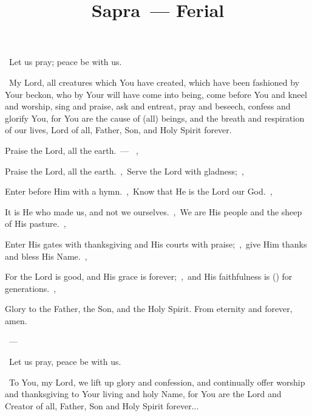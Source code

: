 \documentclass[12pt,twoside,a5paper]{article}
\begin{document}
\title{Sapra~--- Ferial}
\author{}
\date{}
\maketitle


\dd~Let us pray; peace be with us.

\cc~My Lord, all creatures which You have created, which have been fashioned by Your beckon, who by Your will have come into being, come before You and kneel and worship, sing and praise, ask and entreat, pray and beseech, confess and glorify You, for You are the cause of (all) beings, and the breath and respiration of our lives, Lord of all, Father, Son, and Holy Spirit forever.



\begin{halfparskip}
   Praise the Lord, all the earth.~--- ~\sep

  Praise the Lord, all the earth.~\sep\ Serve the Lord with gladness;~\sep

  Enter before Him with a hymn.~\sep\ Know that He is the Lord our God.~\sep

  It is He who made us, and not we ourselves.~\sep\ We are His people and the sheep of His pasture.~\sep

  Enter His gates with thanksgiving and His courts with praise;~\sep\ give Him thanks and bless His Name.~\sep

  For the Lord is good, and His grace is forever;~\sep\ and His faithfulness is () for generations.~\sep

  Glory to the Father, the Son, and the Holy Spirit. From eternity and forever, amen.

  ~--- 
\end{halfparskip}

\dd~Let us pray, peace be with us.

\cc~To You, my Lord, we lift up glory and confession, and continually offer worship and thanksgiving to Your living and holy Name, for You are the Lord and Creator of all, Father, Son and Holy Spirit forever...
\end{document}
